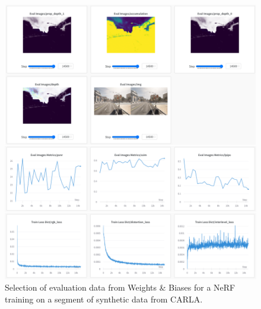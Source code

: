 \begin{figure}[H]
    \centering
    \includegraphics[width=1.0\textwidth]{figures/wandb-eval-data.png}
    \caption{Selection of evaluation data from Weights \& Biases \cite{wandb} for a NeRF training on a segment of synthetic data from CARLA.}
    \label{fig:wandb-eval-data}
\end{figure}